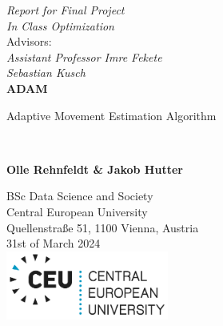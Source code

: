 \documentclass[oneside]{article}
\begin{document}
\begin{titlepage}
   \begin{center}
        \vfill
        \textit{Report for Final Project}\\
        \textit{In Class Optimization}\\
        \vspace{0.5cm}
        Advisors:\\
        \textit{Assistant Professor Imre Fekete}\\
        \textit{Sebastian Kusch}
        \vfill\noindent\hrulefill \\
        \vspace*{1cm}
        \textbf{\huge ADAM}\\
        \vspace{0.5cm}
        
         Adaptive Movement Estimation Algorithm
        
        \noindent\hrulefill \\

       
            
       \vspace{1.5cm}

       \textbf{Olle Rehnfeldt \& Jakob Hutter}

       \vfill
            
       
            
       \vspace{2cm}
       BSc Data Science and Society\\
       Central European University\\
       Quellenstraße 51, 1100 Vienna, Austria\\
       31st of March 2024\\
       \vspace{1.5cm}
       \includegraphics[width=0.4\textwidth]{figures/CEU_Logo_RGB_DualColor.png}
       
            
   \end{center}
\end{titlepage}






\pagestyle{fancy}
\end{document}
